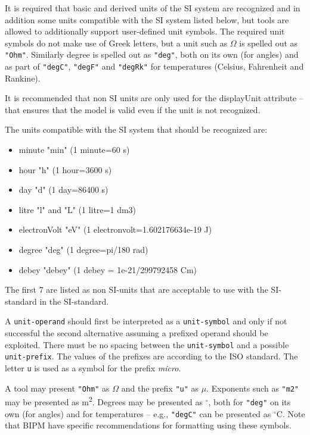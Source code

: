 It is required that basic and derived units of the SI system are recognized and in addition some units compatible with the SI system listed below, but tools are allowed to additionally support user-defined unit symbols.
The required unit symbols do not make use of Greek letters, but a unit such as $\Omega$ is spelled out as \lstinline!"Ohm"!.
Similarly degree is spelled out as \lstinline!"deg"!, both on its own (for angles) and as part of \lstinline!"degC"!, \lstinline!"degF"! and \lstinline!"degRk"! for temperatures (Celsius, Fahrenheit and Rankine).

It is recommended that non SI units are only used for the displayUnit attribute -- that ensures that the model is valid even if the unit is not recognized.

The units compatible with the SI system that should be recognized are:
\begin{itemize}
\item minute "min" (1 minute=60 s)
\item hour "h" (1 hour=3600 s)
\item day "d" (1 day=86400 s)
\item litre "l" and "L" (1 litre=1 dm3)
\item electronVolt "eV" (1 electronvolt=1.602176634e-19 J)
\item degree "deg" (1 degree=pi/180 rad)
\item debey "debey" (1 debey = 1e-21/299792458 Cm)
\end{itemize}
The first 7 are listed as non SI-units that are acceptable to use with the SI-standard in the SI-standard.

A \lstinline[language=grammar]!unit-operand! should first be interpreted as a \lstinline[language=grammar]!unit-symbol! and only if not successful the second alternative assuming a prefixed operand should be exploited.
There must be no spacing between the \lstinline[language=grammar]!unit-symbol! and a possible \lstinline[language=grammar]!unit-prefix!.
The values of the prefixes are according to the ISO standard.
The letter \lstinline!u! is used as a symbol for the prefix \emph{micro}.

\begin{nonnormative}
A tool may present \lstinline!"Ohm"! as $\Omega$ and the prefix \lstinline!"u"! as $\mu$.
Exponents such as \lstinline!"m2"! may be presented as m\textsuperscript{2}.
Degrees may be presented as $^{\circ}$, both for \lstinline!"deg"! on its own (for angles) and for temperatures -- e.g., \lstinline!"degC"! can be presented as $^{\circ}$C.
Note that BIPM have specific recommendations for formatting using these symbols.
\end{nonnormative}

